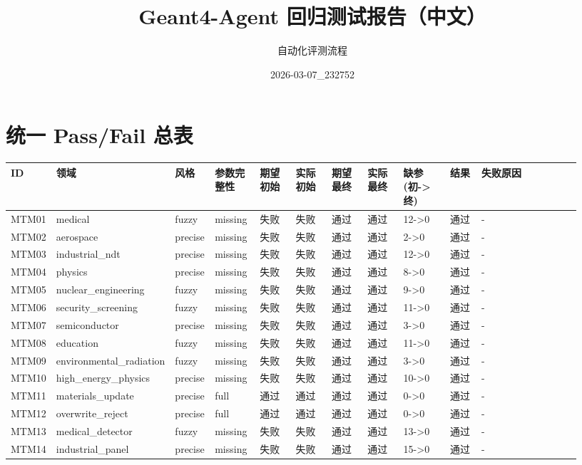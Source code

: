 \documentclass[11pt]{ctexart}
\title{Geant4-Agent 回归测试报告（中文）}
\author{自动化评测流程}
\date{2026-03-07\_232752}
\begin{document}
\maketitle
\section{统一 Pass/Fail 总表}
\begin{longtable}{p{0.06\linewidth}p{0.08\linewidth}p{0.07\linewidth}p{0.08\linewidth}p{0.07\linewidth}p{0.07\linewidth}p{0.07\linewidth}p{0.07\linewidth}p{0.09\linewidth}p{0.06\linewidth}p{0.21\linewidth}}
\toprule
ID & 领域 & 风格 & 参数完整性 & 期望初始 & 实际初始 & 期望最终 & 实际最终 & 缺参(初->终) & 结果 & 失败原因 \\
\midrule
MTM01 & medical & fuzzy & missing & 失败 & 失败 & 通过 & 通过 & 12->0 & 通过 & - \\
MTM02 & aerospace & precise & missing & 失败 & 失败 & 通过 & 通过 & 2->0 & 通过 & - \\
MTM03 & industrial\_ndt & precise & missing & 失败 & 失败 & 通过 & 通过 & 12->0 & 通过 & - \\
MTM04 & physics & precise & missing & 失败 & 失败 & 通过 & 通过 & 8->0 & 通过 & - \\
MTM05 & nuclear\_engineering & fuzzy & missing & 失败 & 失败 & 通过 & 通过 & 9->0 & 通过 & - \\
MTM06 & security\_screening & fuzzy & missing & 失败 & 失败 & 通过 & 通过 & 11->0 & 通过 & - \\
MTM07 & semiconductor & precise & missing & 失败 & 失败 & 通过 & 通过 & 3->0 & 通过 & - \\
MTM08 & education & fuzzy & missing & 失败 & 失败 & 通过 & 通过 & 11->0 & 通过 & - \\
MTM09 & environmental\_radiation & fuzzy & missing & 失败 & 失败 & 通过 & 通过 & 3->0 & 通过 & - \\
MTM10 & high\_energy\_physics & precise & missing & 失败 & 失败 & 通过 & 通过 & 10->0 & 通过 & - \\
MTM11 & materials\_update & precise & full & 通过 & 通过 & 通过 & 通过 & 0->0 & 通过 & - \\
MTM12 & overwrite\_reject & precise & full & 通过 & 通过 & 通过 & 通过 & 0->0 & 通过 & - \\
MTM13 & medical\_detector & fuzzy & missing & 失败 & 失败 & 通过 & 通过 & 13->0 & 通过 & - \\
MTM14 & industrial\_panel & precise & missing & 失败 & 失败 & 通过 & 通过 & 15->0 & 通过 & - \\

\end{longtable}
\end{document}
